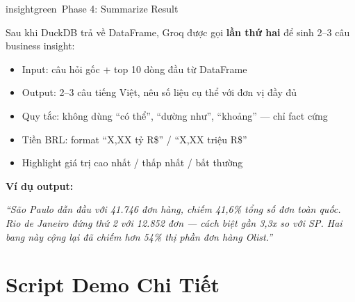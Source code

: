 \documentclass[12pt, a4paper]{article}
\begin{document}
\begin{phasebox}{insightgreen}{\faLightbulb\ Phase 4: Summarize Result}

Sau khi DuckDB trả về DataFrame, Groq được gọi \textbf{lần thứ hai} để sinh
2--3 câu business insight:

\begin{itemize}[leftmargin=1.5em, itemsep=4pt]
  \item Input: câu hỏi gốc + top 10 dòng đầu từ DataFrame
  \item Output: 2--3 câu tiếng Việt, nêu số liệu cụ thể với đơn vị đầy đủ
  \item Quy tắc: không dùng ``có thể'', ``dường như'', ``khoảng'' — chỉ fact cứng
  \item Tiền BRL: format ``X,XX tỷ R\$'' / ``X,XX triệu R\$''
  \item Highlight giá trị cao nhất / thấp nhất / bất thường
\end{itemize}

\vspace{0.5em}
\textbf{Ví dụ output:}
\begin{tcolorbox}[colback=insightgreen!8, colframe=insightgreen, arc=4pt]
\textit{``São Paulo dẫn đầu với 41.746 đơn hàng, chiếm 41,6\% tổng số đơn
toàn quốc. Rio de Janeiro đứng thứ 2 với 12.852 đơn --- cách biệt gần 3,3x
so với SP. Hai bang này cộng lại đã chiếm hơn 54\% thị phần đơn hàng Olist.''}
\end{tcolorbox}

\end{phasebox}

\newpage

\section{Script Demo Chi Tiết}
\end{document}
